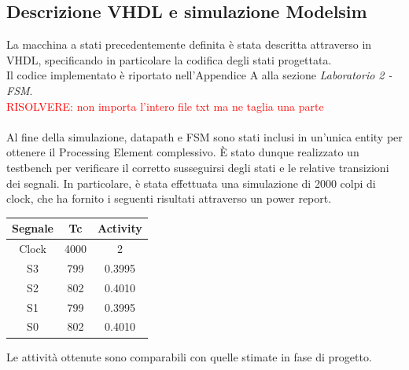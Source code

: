 \documentclass[11pt,  english, makeidx, a4paper, titlepage, oneside]{book}
\begin{document}
\subsection{Descrizione VHDL e simulazione Modelsim}
La macchina a stati precedentemente definita è stata descritta attraverso in VHDL, specificando in particolare la codifica degli stati progettata.
\\
Il codice implementato è riportato nell'Appendice A alla sezione \textit{Laboratorio 2 - FSM}.
\\
\textcolor{red}{RISOLVERE: non importa l'intero file txt ma ne taglia una parte}
\\\\
Al fine della simulazione, datapath e FSM sono stati inclusi in un'unica entity per ottenere il Processing Element complessivo. È stato dunque realizzato un testbench per verificare il corretto susseguirsi degli stati e le relative transizioni dei segnali.
In particolare, è stata effettuata una simulazione di 2000 colpi di clock, che ha fornito i seguenti risultati attraverso un power report.
\\
\begin{center}
	\begin{tabular}{|c|c|c|}
	\hline
	Segnale & Tc & Activity \\ 
	\hline
	Clock & 4000 & 2 \\
	\hline
	S3 & 799 & 0.3995 \\
	\hline
	S2 & 802 & 0.4010 \\
	\hline
	S1 & 799 & 0.3995 \\
	\hline
	S0 & 802 & 0.4010 \\
	\hline
	\end{tabular}	
\end{center}
\vspace{0.3cm}  
Le attività ottenute sono comparabili con quelle stimate in fase di progetto.  
\\
\end{document}
